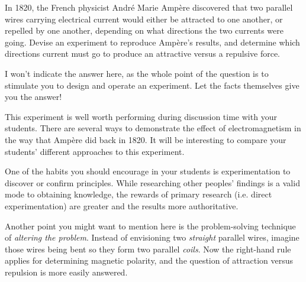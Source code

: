 

In 1820, the French physicist Andr\'e Marie Amp\`ere discovered that two parallel wires carrying electrical current would either be attracted to one another, or repelled by one another, depending on what directions the two currents were going.  Devise an experiment to reproduce Amp\`ere's results, and determine which directions current must go to produce an attractive versus a repulsive force.







I won't indicate the answer here, as the whole point of the question is to stimulate you to design and operate an experiment.  Let the facts themselves give you the answer!







This experiment is well worth performing during discussion time with your students.  There are several ways to demonstrate the effect of electromagnetism in the way that Amp\`ere did back in 1820.  It will be interesting to compare your students' different approaches to this experiment.

One of the habits you should encourage in your students is experimentation to discover or confirm principles.  While researching other peoples' findings is a valid mode to obtaining knowledge, the rewards of primary research (i.e. direct experimentation) are greater and the results more authoritative.

Another point you might want to mention here is the problem-solving technique of {\it altering the problem}.  Instead of envisioning two {\it straight} parallel wires, imagine those wires being bent so they form two parallel {\it coils}.  Now the right-hand rule applies for determining magnetic polarity, and the question of attraction versus repulsion is more easily answered.




